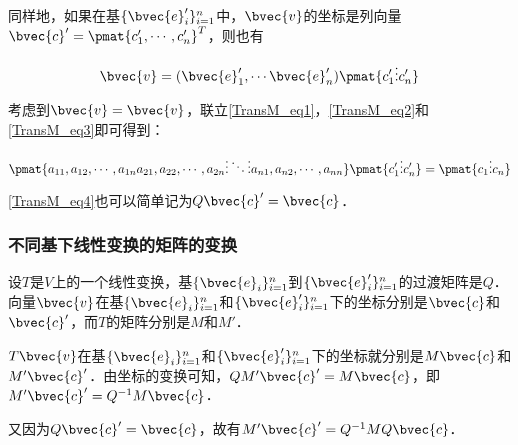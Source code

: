 同样地，如果在基$\{\bvec{e}'_i\}_{i=1}^{n}$中，$\bvec{v}$的坐标是列向量$\bvec{c}'=\pmat{c'_1,\cdots, c'_n}^T$，则也有

\begin{equation}\label{TransM_eq3}
\bvec{v}=(\bvec{e}'_1, \cdots\bvec{e}'_n)\pmat{c'_1\newline\vdots\newline c_n'}
\end{equation}

考虑到$\bvec{v}=\bvec{v}$，联立\autoref{TransM_eq1}，\autoref{TransM_eq2}和\autoref{TransM_eq3}即可得到：

\begin{equation}\label{TransM_eq4}
\pmat{a_{11},a_{12},\cdots,a_{1n}\newline a_{21},a_{22},\cdots,a_{2n}\newline\vdots\ddots\vdots\newline a_{n1},a_{n2},\cdots,a_{nn}}\pmat{c'_1\newline\vdots\newline c_n'}=\pmat{c_1\newline\vdots\newline c_n}
\end{equation}

\autoref{TransM_eq4}也可以简单记为$Q\bvec{c}'=\bvec{c}$．

\subsubsection{不同基下线性变换的矩阵的变换}


设$T$是$V$上的一个线性变换，基$\{\bvec{e}_i\}_{i=1}^{n}$到$\{\bvec{e}'_i\}_{i=1}^{n}$的过渡矩阵是$Q$．向量$\bvec{v}$在基$\{\bvec{e}_i\}_{i=1}^{n}$和$\{\bvec{e}'_i\}_{i=1}^{n}$下的坐标分别是$\bvec{c}$和$\bvec{c}'$，而$T$的矩阵分别是$M$和$M'$．

$T\bvec{v}$在基$\{\bvec{e}_i\}_{i=1}^{n}$和$\{\bvec{e}'_i\}_{i=1}^{n}$下的坐标就分别是$M\bvec{c}$和$M'\bvec{c}'$．由坐标的变换可知，$QM'\bvec{c}'=M\bvec{c}$，即$M'\bvec{c}'=Q^{-1}M\bvec{c}$．

又因为$Q\bvec{c}'=\bvec{c}$，故有$M'\bvec{c}'=Q^{-1}MQ\bvec{c}$．